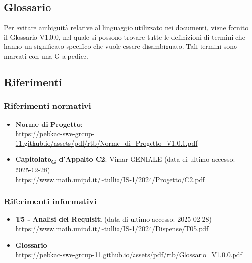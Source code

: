 \subsection{Glossario}
Per evitare ambiguità relative al linguaggio utilizzato nei documenti, viene fornito il Glossario V1.0.0, nel quale si possono trovare tutte le definizioni di termini che hanno un significato specifico che vuole essere disambiguato. Tali termini sono marcati con una G a pedice.
\subsection{Riferimenti}
\subsubsection{Riferimenti  normativi}  
\begin{itemize}
    \item \textbf{Norme di Progetto}:\\
    \url{https://pebkac-swe-group-11.github.io/assets/pdf/rtb/Norme_di_Progetto_V1.0.0.pdf} 

    \item \textbf{Capitolato\textsubscript{G} d'Appalto C2}: Vimar GENIALE (data di ultimo accesso: 2025-02-28)\\
    \url{https://www.math.unipd.it/~tullio/IS-1/2024/Progetto/C2.pdf}
\end{itemize}
\subsubsection{Riferimenti informativi}
\begin{itemize}
    \item \textbf{T5 - Analisi dei Requisiti} (data di ultimo accesso: 2025-02-28)\\
    \url{https://www.math.unipd.it/~tullio/IS-1/2024/Dispense/T05.pdf}
    
    \item \textbf{Glossario} \\
    \url{https://pebkac-swe-group-11.github.io/assets/pdf/rtb/Glossario_V1.0.0.pdf}
\end{itemize}
